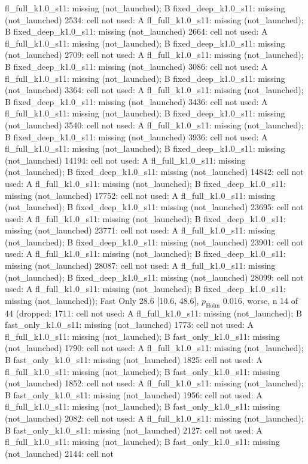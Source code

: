 \begin{table}[t]
{fl\_full\_k1.0\_s11: missing (not\_launched); B fixed\_deep\_k1.0\_s11: missing (not\_launched) \textbar{} 2534: cell not used: A fl\_full\_k1.0\_s11: missing (not\_launched); B fixed\_deep\_k1.0\_s11: missing (not\_launched) \textbar{} 2664: cell not used: A fl\_full\_k1.0\_s11: missing (not\_launched); B fixed\_deep\_k1.0\_s11: missing (not\_launched) \textbar{} 2709: cell not used: A fl\_full\_k1.0\_s11: missing (not\_launched); B fixed\_deep\_k1.0\_s11: missing (not\_launched) \textbar{} 3086: cell not used: A fl\_full\_k1.0\_s11: missing (not\_launched); B fixed\_deep\_k1.0\_s11: missing (not\_launched) \textbar{} 3364: cell not used: A fl\_full\_k1.0\_s11: missing (not\_launched); B fixed\_deep\_k1.0\_s11: missing (not\_launched) \textbar{} 3436: cell not used: A fl\_full\_k1.0\_s11: missing (not\_launched); B fixed\_deep\_k1.0\_s11: missing (not\_launched) \textbar{} 3540: cell not used: A fl\_full\_k1.0\_s11: missing (not\_launched); B fixed\_deep\_k1.0\_s11: missing (not\_launched) \textbar{} 3936: cell not used: A fl\_full\_k1.0\_s11: missing (not\_launched); B fixed\_deep\_k1.0\_s11: missing (not\_launched) \textbar{} 14194: cell not used: A fl\_full\_k1.0\_s11: missing (not\_launched); B fixed\_deep\_k1.0\_s11: missing (not\_launched) \textbar{} 14842: cell not used: A fl\_full\_k1.0\_s11: missing (not\_launched); B fixed\_deep\_k1.0\_s11: missing (not\_launched) \textbar{} 17752: cell not used: A fl\_full\_k1.0\_s11: missing (not\_launched); B fixed\_deep\_k1.0\_s11: missing (not\_launched) \textbar{} 23695: cell not used: A fl\_full\_k1.0\_s11: missing (not\_launched); B fixed\_deep\_k1.0\_s11: missing (not\_launched) \textbar{} 23771: cell not used: A fl\_full\_k1.0\_s11: missing (not\_launched); B fixed\_deep\_k1.0\_s11: missing (not\_launched) \textbar{} 23901: cell not used: A fl\_full\_k1.0\_s11: missing (not\_launched); B fixed\_deep\_k1.0\_s11: missing (not\_launched) \textbar{} 28087: cell not used: A fl\_full\_k1.0\_s11: missing (not\_launched); B fixed\_deep\_k1.0\_s11: missing (not\_launched) \textbar{} 28099: cell not used: A fl\_full\_k1.0\_s11: missing (not\_launched); B fixed\_deep\_k1.0\_s11: missing (not\_launched)); Fast Only 28.6 [10.6, 48.6], $p_\mathrm{Holm}$ 0.016, worse, n 14 of 44 (dropped: 1711: cell not used: A fl\_full\_k1.0\_s11: missing (not\_launched); B fast\_only\_k1.0\_s11: missing (not\_launched) \textbar{} 1773: cell not used: A fl\_full\_k1.0\_s11: missing (not\_launched); B fast\_only\_k1.0\_s11: missing (not\_launched) \textbar{} 1790: cell not used: A fl\_full\_k1.0\_s11: missing (not\_launched); B fast\_only\_k1.0\_s11: missing (not\_launched) \textbar{} 1825: cell not used: A fl\_full\_k1.0\_s11: missing (not\_launched); B fast\_only\_k1.0\_s11: missing (not\_launched) \textbar{} 1852: cell not used: A fl\_full\_k1.0\_s11: missing (not\_launched); B fast\_only\_k1.0\_s11: missing (not\_launched) \textbar{} 1956: cell not used: A fl\_full\_k1.0\_s11: missing (not\_launched); B fast\_only\_k1.0\_s11: missing (not\_launched) \textbar{} 2082: cell not used: A fl\_full\_k1.0\_s11: missing (not\_launched); B fast\_only\_k1.0\_s11: missing (not\_launched) \textbar{} 2127: cell not used: A fl\_full\_k1.0\_s11: missing (not\_launched); B fast\_only\_k1.0\_s11: missing (not\_launched) \textbar{} 2144: cell not }
\end{table}
